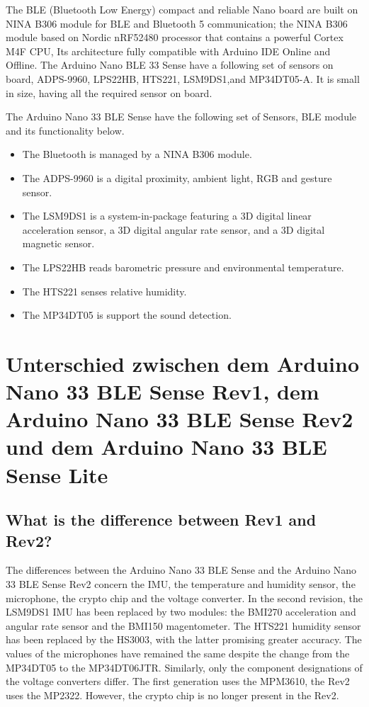The BLE (Bluetooth Low Energy) compact and reliable Nano board are built on NINA B306 module for BLE and Bluetooth 5 communication; the NINA B306 module based on Nordic nRF52480 processor that contains a powerful Cortex M4F CPU, Its architecture fully compatible with Arduino IDE Online and Offline. The Arduino Nano BLE 33 Sense have a following set of sensors on board, ADPS-9960, LPS22HB, HTS221, LSM9DS1,and MP34DT05-A. It is small in size, having all the required sensor on board. \cite{Arduino:2021}


The Arduino Nano 33 BLE Sense have the following set of Sensors, BLE module and its functionality below.

\begin{itemize}
    \item The Bluetooth is managed by a NINA B306 module.
    \item The ADPS-9960 is a digital proximity, ambient light, RGB and gesture sensor.
    \item The LSM9DS1 is a system-in-package featuring a 3D digital linear acceleration sensor, a 3D digital angular rate sensor, and a 3D digital magnetic sensor.
    \item The LPS22HB reads barometric pressure and environmental temperature.
    \item The HTS221 senses relative humidity.
    \item The MP34DT05 is support the sound detection.
\end{itemize}


\section{Unterschied zwischen dem Arduino Nano 33 BLE Sense Rev1, dem Arduino Nano 33 BLE Sense Rev2 und dem Arduino Nano 33 BLE Sense Lite}

\subsection{What is the difference between Rev1 and Rev2?}

The differences between the Arduino Nano 33 BLE Sense and the Arduino Nano 33 BLE Sense Rev2 concern the IMU, the temperature and humidity sensor, the microphone, the crypto chip and the voltage converter. In the second revision, the LSM9DS1 IMU has been replaced by two modules: the BMI270 acceleration and angular rate sensor and the BMI150 magentometer. The HTS221 humidity sensor has been replaced by the HS3003, with the latter promising greater accuracy. The values of the microphones have remained the same despite the change from the MP34DT05 to the MP34DT06JTR. Similarly, only the component designations of the voltage converters differ. The first generation uses the MPM3610, the Rev2 uses the MP2322. However, the crypto chip is no longer present in the Rev2.



